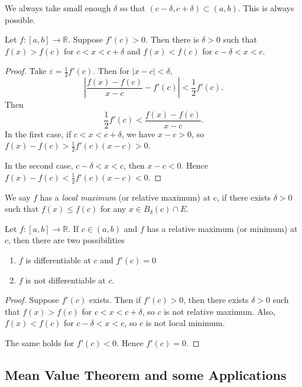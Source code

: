 \begin{remark}
	We always take small enough $\delta$ so that  $(c - \delta, c+\delta) \subset (a,b)$. This is always possible.
\end{remark}
\begin{proposition}
	Let $f: [a,b] \to \mathbb{R}$. Suppose $f'(c) > 0$. Then there is $\delta>0$ such that $f(x) > f(c)$ for $c < x < c+\delta$ and $f(x) < f(c)$ for $c - \delta < x < c$.
\end{proposition}
\begin{proof}
	Take $\varepsilon = \frac{1}{2}f'(c)$. Then for $|x - c| < \delta$,
	\[
		\left| \frac{f(x) - f(c)}{x - c} - f'(c) \right| < \frac{1}{2} f'(c)
	.\] 
	Then
	\[
		\frac{1}{2} f'(c) < \frac{f(x) - f(c)}{x - c}
	.\] 
	In the first case, if $c < x < c+\delta$, we have $x - c > 0$, so $f(x) - f(c) > \frac{1}{2} f'(c) ( x - c ) > 0$.

	In the second case, $c - \delta < x < c$, then $x - c < 0$. Hence $f(x) - f(c) < \frac{1}{2} f'(c) (x - c) < 0$.
\end{proof}

\begin{definition}
	We say $f$ has a \textit{local maximum} (or relative maximum) at $c$, if there exists $\delta>0$ such that $f(x) \le f(c)$ for any $x \in B_\delta(c) \cap E$.
\end{definition}

\begin{theorem}
	Let $f: [a,b] \to \mathbb{R}$. If $c \in (a,b)$ and $f$ has a relative maximum (or minimum) at $c$, then there are two possibilities
	\begin{enumerate}
		\item $f$ is differentiable at $c$ and $f'(c) = 0$ 
		\item $f$ is not differentiable at $c$.
	\end{enumerate}
\end{theorem}
\begin{proof}
	Suppose $f'(c)$ exists. Then if $f'(c) > 0$, then there exists $\delta>0$ such that $f(x) > f(c)$ for $c < x < c+\delta$, so $c$ is not relative maximum. Also, $f(x) < f(c) $ for $c - \delta< x < c$, so $c$ is not local minimum.

	The same holds for $f'(c) < 0$. Hence $f'(c) = 0$.
\end{proof}

\subsection{Mean Value Theorem and some Applications}

